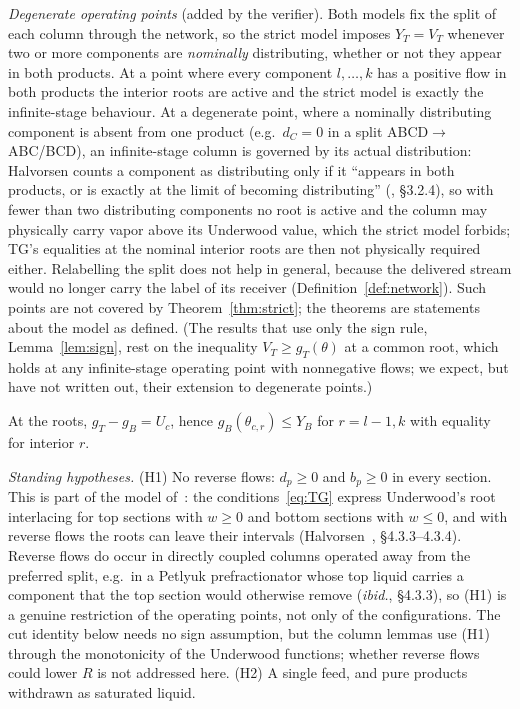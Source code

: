 \documentclass[11pt,a4paper]{report}
\begin{document}
\emph{Degenerate operating points} (added by the verifier). Both models fix the split of each column through the
network, so the strict model imposes $Y_T=V_T$ whenever two or more components are \emph{nominally} distributing,
whether or not they appear in both products. At a point where every component $l,\dots,k$ has a positive flow in
both products the interior roots are active and the strict model is exactly the infinite-stage behaviour. At a
degenerate point, where a nominally distributing component is absent from one product (e.g.\ $d_C=0$ in a split
ABCD$\to$ABC/BCD), an infinite-stage column is governed by its actual distribution: Halvorsen counts a component as
distributing only if it ``appears in both products, or is exactly at the limit of becoming distributing''
(\autocite{HalvorsenThesis}, \S3.2.4), so with fewer than two distributing components no root is active and the column
may physically carry vapor above its Underwood value, which the strict model forbids; TG's equalities at the nominal
interior roots are then not physically required either. Relabelling the split does not help in general, because the
delivered stream would no longer carry the label of its receiver (Definition~\ref{def:network}). Such points are not
covered by Theorem~\ref{thm:strict}; the theorems are statements about the model as defined. (The results that use
only the sign rule, Lemma~\ref{lem:sign}, rest on the inequality $V_T\ge g_T(\theta)$ at a common root, which holds at
any infinite-stage operating point with nonnegative flows; we expect, but have not written out, their extension to
degenerate points.)

At the roots, $g_T-g_B=U_c$, hence
$g_B(\theta_{c,r})\le Y_B$ for $r=l-1,k$ with equality for interior $r$.

\emph{Standing hypotheses.} (H1) No reverse flows: $d_p\ge0$ and $b_p\ge0$ in every section. This is part of the
model of~\autocite{TGAT,Nallasivam2016}: the conditions~\eqref{eq:TG} express Underwood's root interlacing for top
sections with $w\ge0$ and bottom sections with $w\le0$, and with reverse flows the roots can leave their intervals
(Halvorsen~\autocite{HalvorsenThesis}, \S4.3.3--4.3.4). Reverse flows do occur in directly coupled columns operated
away from the preferred split, e.g.\ in a Petlyuk prefractionator whose top liquid carries a component that the top
section would otherwise remove (\emph{ibid.}, \S4.3.3), so (H1) is a genuine restriction of the operating points,
not only of the configurations.
The cut identity below needs no sign assumption, but the column lemmas use (H1) through the monotonicity of the
Underwood functions; whether reverse flows could lower $R$ is not addressed here. (H2) A single feed, and pure
products withdrawn as saturated liquid.
\end{document}
